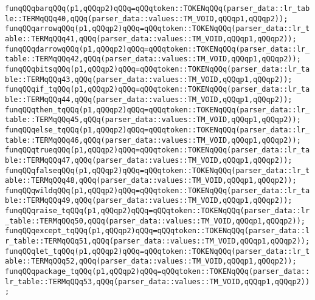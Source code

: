 \verb|funqQQqbarqQQq(p1,qQQqp2)qQQq=qQQqtoken::TOKENqQQq(parser_data::lr_table::TERMqQQq40,qQQq(parser_data::values::TM_VOID,qQQqp1,qQQqp2));|\newline
\verb|funqQQqarrowqQQq(p1,qQQqp2)qQQq=qQQqtoken::TOKENqQQq(parser_data::lr_table::TERMqQQq41,qQQq(parser_data::values::TM_VOID,qQQqp1,qQQqp2));|\newline
\verb|funqQQqdarrowqQQq(p1,qQQqp2)qQQq=qQQqtoken::TOKENqQQq(parser_data::lr_table::TERMqQQq42,qQQq(parser_data::values::TM_VOID,qQQqp1,qQQqp2));|\newline
\verb|funqQQqbitsqQQq(p1,qQQqp2)qQQq=qQQqtoken::TOKENqQQq(parser_data::lr_table::TERMqQQq43,qQQq(parser_data::values::TM_VOID,qQQqp1,qQQqp2));|\newline
\verb|funqQQqif_tqQQq(p1,qQQqp2)qQQq=qQQqtoken::TOKENqQQq(parser_data::lr_table::TERMqQQq44,qQQq(parser_data::values::TM_VOID,qQQqp1,qQQqp2));|\newline
\verb|funqQQqthen_tqQQq(p1,qQQqp2)qQQq=qQQqtoken::TOKENqQQq(parser_data::lr_table::TERMqQQq45,qQQq(parser_data::values::TM_VOID,qQQqp1,qQQqp2));|\newline
\verb|funqQQqelse_tqQQq(p1,qQQqp2)qQQq=qQQqtoken::TOKENqQQq(parser_data::lr_table::TERMqQQq46,qQQq(parser_data::values::TM_VOID,qQQqp1,qQQqp2));|\newline
\verb|funqQQqtrueqQQq(p1,qQQqp2)qQQq=qQQqtoken::TOKENqQQq(parser_data::lr_table::TERMqQQq47,qQQq(parser_data::values::TM_VOID,qQQqp1,qQQqp2));|\newline
\verb|funqQQqfalseqQQq(p1,qQQqp2)qQQq=qQQqtoken::TOKENqQQq(parser_data::lr_table::TERMqQQq48,qQQq(parser_data::values::TM_VOID,qQQqp1,qQQqp2));|\newline
\verb|funqQQqwildqQQq(p1,qQQqp2)qQQq=qQQqtoken::TOKENqQQq(parser_data::lr_table::TERMqQQq49,qQQq(parser_data::values::TM_VOID,qQQqp1,qQQqp2));|\newline
\verb|funqQQqraise_tqQQq(p1,qQQqp2)qQQq=qQQqtoken::TOKENqQQq(parser_data::lr_table::TERMqQQq50,qQQq(parser_data::values::TM_VOID,qQQqp1,qQQqp2));|\newline
\verb|funqQQqexcept_tqQQq(p1,qQQqp2)qQQq=qQQqtoken::TOKENqQQq(parser_data::lr_table::TERMqQQq51,qQQq(parser_data::values::TM_VOID,qQQqp1,qQQqp2));|\newline
\verb|funqQQqlet_tqQQq(p1,qQQqp2)qQQq=qQQqtoken::TOKENqQQq(parser_data::lr_table::TERMqQQq52,qQQq(parser_data::values::TM_VOID,qQQqp1,qQQqp2));|\newline
\verb|funqQQqpackage_tqQQq(p1,qQQqp2)qQQq=qQQqtoken::TOKENqQQq(parser_data::lr_table::TERMqQQq53,qQQq(parser_data::values::TM_VOID,qQQqp1,qQQqp2));|\newline
